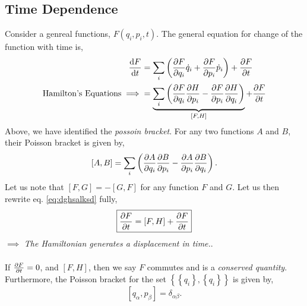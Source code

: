 \documentclass{book}
\begin{document}
\subsection{Time Dependence}
Consider a genreal functions, $F(q_i,p_i,t)$. The general equation for change of the function with time is,
\begin{equation}
	\begin{split}
	\dv{F}{t} & = \sum_i\left(\pdv{F}{q_i}\Dot{q}_i + \pdv{F}{p_i}\Dot{p}_i\right) + \pdv{F}{t} \\
	\text{Hamilton's Equations} \implies & = \underbrace{\sum_i\left(\pdv{F}{q_i}\pdv{H}{p_i}-\pdv{F}{p_i}\pdv{H}{q_i}\right)}_{\left[F,H\right]} + \pdv{F}{t}
	\end{split} \label{eq:dghsalksd}
\end{equation}
Above, we have identified the \textit{possoin bracket}. For any two functions $A$ and $B$, their Poisson bracket is given by,
\begin{equation}
	\left[A,B\right] = \sum_i \left(\pdv{A}{q_i}\pdv{B}{p_i} - \pdv{A}{p_i}\pdv{B}{q_i}\right).
\end{equation} Let us note that $\left[F,G\right] = - \left[G,F\right]$ for any function $F$ and $G$. Let us then rewrite eq. \eqref{eq:dghsalksd} fully,
\begin{equation}
	\boxed{\pdv{F}{t} = \left[F,H\right] + \pdv{F}{t}} \label{eq:important}
\end{equation}
$\implies$ \textit{The Hamiltonian generates a displacement in time.}.
\\\\
If $\pdv{F}{t} = 0$, and $\left[F, H\right]$, then we say $F$ commutes and is a \textit{conserved quantity}. Furthermore, the Poisson bracket for the set $\left\{\left\{q_i\right\},\left\{q_i\right\}\right\}$ is given by,
\begin{equation}
	\left[q_{\alpha},p_{\beta}\right] = \delta_{\alpha\beta}.
\end{equation}
\end{document}
